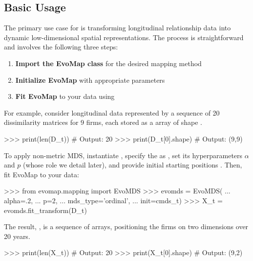 \documentclass[article]{jss}
\begin{document}
\subsection{Basic Usage} 

The primary use case for  is transforming longitudinal relationship data into dynamic low-dimensional 
spatial representations. The process is straightforward and involves the following three steps:

\begin{enumerate}
  \item \textbf{Import the EvoMap class} for the desired mapping method
  \item \textbf{Initialize EvoMap} with appropriate parameters
  \item \textbf{Fit EvoMap} to your data using 
\end{enumerate}

For example, consider longitudinal data represented by a sequence of 20 dissimilarity matrices for 9 firms, each stored as a
 array of shape .

\begin{CodeChunk}
\begin{CodeInput}
>>> print(len(D_t))       # Output: 20
>>> print(D_t[0].shape)   # Output: (9,9)
\end{CodeInput}
\end{CodeChunk}

To apply non-metric MDS, instantiate , specify the  as , 
set its hyperparameters $\alpha$ and $p$ (whose role we detail later), and provide initial starting positions . 
Then, fit EvoMap to your data: 

\begin{Code}
>>> from evomap.mapping import EvoMDS   
>>> evomds = EvoMDS(
...     alpha=.2, 
...     p=2, 
...     mds_type='ordinal', 
...     init=cmds_t)                  
>>> X_t = evomds.fit_transform(D_t)  
\end{Code}

The result, , is a sequence of  arrays,  
positioning the firms on two dimensions over 20 years. 

\begin{CodeChunk}
\begin{CodeInput}
>>> print(len(X_t))   # Output: 20
>>> print(X_t[0].shape)   # Output: (9,2)   
\end{CodeInput}
\end{CodeChunk}
\end{document}
